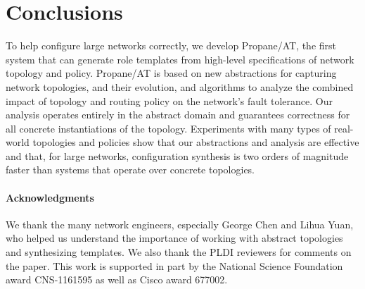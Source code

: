 \documentclass[numbers, 10pt, preprint]{sigplanconf}
\newcommand{\sysname}{{\text{}\small \sf Propane/AT}\xspace}
\newcommand{\para}[1]{\paragraph*{\textbf{#1}}}
\begin{document}
%
%
%
%

\section{Conclusions}
\label{sec:conclusions}

To help configure large networks correctly, we develop \sysname, the first system that can generate role templates from high-level specifications of network topology and policy. \sysname is based on new abstractions for capturing network topologies, and their evolution, and algorithms to analyze the combined impact of topology and routing policy on the network's fault tolerance. Our analysis operates entirely in the abstract domain and guarantees correctness for all concrete instantiations of the topology. Experiments with many types of real-world topologies and policies show that our abstractions and analysis are effective and that, for large networks, configuration synthesis is two orders of magnitude faster than systems that operate over concrete topologies.

\para{Acknowledgments}
We thank the many network engineers, especially George Chen and Lihua Yuan, who helped us understand the importance of working with abstract topologies and synthesizing templates. 
We also thank the PLDI reviewers for comments on the paper. This work is supported in part by the National Science Foundation award CNS-1161595 as well as Cisco award 677002.


%
%
%
%

\balance






%
%
%
%
\end{document}
